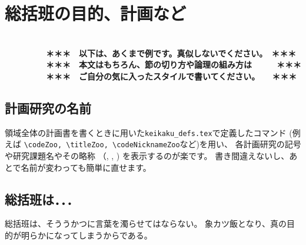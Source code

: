 \documentclass[11pt,a4j,dvipdfmx]{jarticle} 					%
\newcommand{\研究課題名}{象の卵}
\newcommand{\研究機関名}{逢坂大学}
\newcommand{\研究代表者氏名}{湯川秀樹}
\newcommand{\研究期間の最終元号年度}{8}  %
\begin{document}

\section{総括班の目的、計画など}

\JSPSInstructions		%
\textbf{\\　　　　　＊＊＊　以下は、あくまで例です。真似しないでください。　＊＊＊\\
　　　　　＊＊＊　本文はもちろん、節の切り方や論理の組み方は　　　＊＊＊\\
　　　　　＊＊＊　ご自分の気に入ったスタイルで書いてください。　　＊＊＊}

\subsection{計画研究の名前}
        領域全体の計画書を書くときに用いた\texttt{keikaku\_defs.tex}で定義したコマンド
        (例えば
        \texttt{\textbackslash codeZoo, \textbackslash titleZoo, \textbackslash codeNicknameZoo}など)を用い、
        各計画研究の記号や研究課題名やその略称
        （\codeZoo, \titleZoo, \codeNicknameZoo)
        を表示するのが楽です。
       書き間違えないし、あとで名前が変わっても簡単に直せます。

\subsection{総括班は．．．}
        総括班は、そううかつに言葉を濁らせてはならない。
        象カツ飯となり、真の目的が明らかになってしまうからである。




\end{document}
